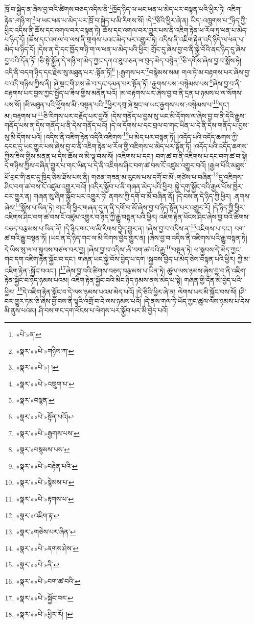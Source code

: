 ཁྲོ་བ་སྐྱེད་ན་ཞེས་བྱ་བའི་ཚིགས་བཅད་འདིས་ནི་\footnote{«པེ་»ན་}ཁྱོད་ཉིད་ལ་ཡང་ཕན་པ་མེད་པར་བསྟན་པའི་ཕྱིར་ཏེ། འཇིག་རྟེན་:གཉི་ག་\footnote{«སྣར་»«པེ་»གཉིས་ཀ་}ལ་ཡང་ཕན་པ་མེད་པར་ཁྲོ་བ་སྐྱེད་པ་མི་རིགས་སོ། །དེ་\footnote{«སྣར་»«པེ་»། །}ཅིའི་ཕྱིར་ཞེ་ན། ཡིད་:འཁྲུགས་པ་\footnote{«སྣར་»«པེ་»འཁྲུག་པ་}ཉིད་ཀྱི་ཕྱིར་འདིས་ནི་ཆོས་དང་འགལ་བར་བསྟན་ཏེ། ཆོས་དང་འགལ་བར་གྱུར་པས་ནི་འཇིག་རྟེན་ཕ་རོལ་ཏུ་ཕན་པ་མེད་པ་ཉིད་དོ། །ཆོས་དང་འགལ་བ་ལས་ནི་གྲགས་པའང་མེད་པར་འགྱུར་ཏེ། འདིས་ནི་འཇིག་རྟེན་འདི་ཉིད་ལ་ཕན་པ་མེད་པ་ཉིད་དོ། །དེས་ན་དེ་དང་ཁྱོད་གཉི་ག་ལ་ཕན་པ་མེད་པའི་ཕྱིར། གྲོང་དུ་ཞེས་བྱ་བ་ནི་སྐྱེ་བོའི་ནང་ཉིད་དུ་ཞེས་བྱ་བའི་དོན་ཏོ། །ཅི་སྟེ་སྐྱོན་དེ་གཉི་ག་མེད་ཀྱང་དཀའ་ཐུབ་ཅན་ལ་བུད་མེད་བསྙེན་\footnote{«སྣར་»བསྙན་}ཅི་དགོས་ཞེས་བྱ་བ་སྨོས་ཏེ། འདི་ནི་བདག་ཉིད་དང་རྗེས་སུ་མཐུན་པར་:སྟོན་ཏོ།\footnote{«སྣར་»«པེ་»སྟོན་པའོ།} །:རྒྱགས་པར་\footnote{«སྣར་»«པེ་»རྒྱགས་པས་}བསྙེམས་སམ། གལ་ཏེ་མ་བརྟགས་པར་ཞེས་བྱ་བ་འདི་གཉིས་ཀྱིས་ནི། ཞེ་སྡང་གི་ཤས་ཆེ་བ་དང་དམན་པར་སྟོན་ཏོ། །རྒྱགས་པས་:བསྙེམས་པས་\footnote{«སྣར་»བསྙམས་པས་}ཞེས་བྱ་བ་ནི་བརྟགས་པར་བྱས་ཀྱང་སྤྱོད་པ་ཟིལ་གྱིས་མནོན་པའོ། །མ་བརྟགས་པར་ཞེས་བྱ་བ་ནི་དྲན་པ་ཉམས་པ་ལ་སོགས་པས་སོ། །མི་མཐུན་པའི་ཕྱོགས་མི་:བསྟན་པའི་\footnote{«སྣར་»«པེ་»བརྟེན་པའི་}ཕྱིར་དགྲ་ཞེ་སྡང་ལ་ཡང་རྒྱགས་པས་:བསྙེམས་པ་\footnote{«སྣར་»«པེ་»སྙེམས་པ་}དང་། མ་:བརྟགས་པ་\footnote{«སྣར་»«པེ་»རྟགས་པ་}ཅི་རིགས་པར་བརྗོད་པར་བྱའོ། །དེས་གནོད་པ་བྱས་སུ་ཡང་མི་དོགས་ལ་ཞེས་བྱ་བ་ནི་དེའི་རྒྱུས་གནོད་པས་ན་དེས་གནོད་པ་ནི་དེས་གནོད་པའོ། །དེ་ལ་དོགས་པ་དང་བྲལ་བ་གང་ཡིན་པ་དེ་ནི་དེས་གནོད་པ་བྱས་སུ་མི་དོགས་པའོ། །འདིས་ནི་འཇིག་རྟེན་འདིའི་འཇིགས་\footnote{«སྣར་»འཇིག་རྟ་}པ་མེད་པར་བསྟན་ཏོ། །འདོད་པའི་འདོད་ཆགས་ཀྱི་དབང་དུ་ཡང་གྱུར་པས་ཞེས་བྱ་བ་ནི་འཇིག་རྟེན་ཕ་རོལ་གྱི་འཇིགས་པ་མེད་པར་སྟོན་ཏོ། །འདོད་པའི་འདོད་ཆགས་ཀྱིས་ཟིལ་གྱིས་མནན་པ་དེས་ཆོས་ལ་མི་ལྟ་བས་སོ། །འཇིགས་པ་དང་། བག་ཚ་བ་ནི་འཇིགས་པ་དང་བག་ཚ་བ་སྟེ། དེ་གཉིས་ཀྱིས་བཞིན་གྱུར་པ་གང་ཡིན་པ་དེ་ནི་འཇིགས་ཤིང་བག་ཚ་བས་ངོ་འཛུམ་འགྱུར་བའོ། །རྒྱལ་པོའི་མཐུས་ཕོ་བྲང་གི་ནང་དུ་ཁྲིད་ཅེས་ཐོས་པས་ནི། གཅན་གཟན་མ་རུངས་པས་དགོ་བ་མོ་:གཙེས་པ་བཞིན་\footnote{«སྣར་»གཅེས་པར་ཞིན་}དུ་འཇིགས་ཤིང་བག་ཚ་བས་ངོ་འཛུམ་འགྱུར་བའོ། །འདིར་སྐྱོབ་པ་ནི་གཞན་མེད་པའི་ཕྱིར། སྐྱེ་དགུ་སྐྱོང་བའི་རྒྱལ་པོས་ཁྱེར་བར་གྱུར་ན། གཞན་སུ་ཞིག་སྐྱོབ་པར་འགྱུར་ཏེ། ནགས་ཀྱི་དགོ་བ་མོ་བཞིན་ནོ། །དེ་བས་ན་དེ་ཉིད་ཀྱི་ཕྱིར། :ནགས་ཞེས་\footnote{«སྣར་»«པེ་»ནགས་ཤེས་}སྨོས་པ་ཡིན་ཏེ། གང་གི་ཕྱིར་གཞན་དུ་ན་ནི་དགོ་བ་མོ་ཞེས་བྱ་བ་ཉིད་སྟོན་པར་འགྱུར་རོ། །དེ་ཉིད་ཀྱི་ཕྱིར་འཇིགས་ཤིང་བག་ཚ་བས་ངོ་འཛུམ་འགྱུར་བ་ཉིད་ཀྱི་རྒྱུ་བསྟན་པའི་ཕྱིར། འཇིག་རྟེན་ཕོངས་ཤིང་ཞེས་བྱ་བའི་ཚིགས་བཅད་བརྩམས་པ་ཡིན་ནོ། །དེ་ཉིད་གང་ལ་མི་རིགས་བྱེད་གྱུར་ན། །ཞེས་བྱ་བ་འདིས་ན་\footnote{«སྣར་»«པེ་»ནི་}འཇིགས་པ་དང་། བག་ཚ་བའི་རྒྱུ་བསྟན་ཏོ། །ཡང་ན་དེ་ཉིད་གང་ལ་མི་རིགས་བྱེད་གྱུར་ན། །ཞེས་བྱ་བ་འདིས་ནི་འཇིགས་པའི་རྒྱུ་བསྟན་ཏེ། དེ་ཡིས་སུ་ལ་ཕ་སྐྱབས་བཙལ་བར་བྱ། །ཞེས་བྱ་བ་འདིས་:ནི་བག་ཚ་བའི་རྒྱུ་\footnote{«སྣར་»«པེ་»བག་ཚ་བའི་}བསྟན་ཏེ། ཕ་སྐྱབས་དེ་མེད་ཀྱང་གང་དག་འཇིག་རྟེན་སྐྱོང་བ་དང་། གཞན་ཡང་སྐྱེ་བོས་བྱེད་པ་དག །སྐྱབས་བྱེད་པ་མེད་ཅེས་བསྟན་པའི་ཕྱིར། ཀྱེ་མ་འཇིག་རྟེན་:སྐྱོང་བའང་། །\footnote{«སྣར་»«པེ་»སྐྱོང་བར་}ཞེས་བྱ་བའི་ཚིགས་བཅད་བརྩམས་པ་ཡིན་ཏེ། ཚུལ་ལས་ཉམས་ཞེས་བྱ་བ་ནི་འཇིག་རྟེན་སྐྱོང་བ་ཉིད་ཉམས་པའམ། འཇིག་རྟེན་སྐྱོང་བའི་མིང་ཉིད་ཉམས་ནས་མེད་པ་སྟེ། གཞན་གྱི་དོན་མི་བྱེད་པའི་ཕྱིར། \footnote{«སྣར་»«པེ་»ཕྱིར་རོ། ། }དེ་འཇིག་རྟེན་སྐྱོང་བ་དེ་ལས་ཉམས་པའམ་མེད་པའོ། །དེ་ཅིའི་ཕྱིར་ཞེ་ན། ལེགས་པར་མི་སྐྱོང་བས་སོ། །ཤི་བར་གྱུར་ཏམ་ཅི་ཞེས་བྱ་བས་ནི་ལྷའི་འགྲོ་བ་དེ་ལས་ཉམས་པའོ། །དེ་ནས་གལ་ཏེ་ཡོད་ཀྱང་ཚུལ་ལས་ཉམས་པ་དེས་མི་ནུས་པའམ། ཤི་བས་གང་དག་ཕོངས་པ་ལེགས་པར་སྐྱོབ་པར་མི་བྱེད་པའོ། 